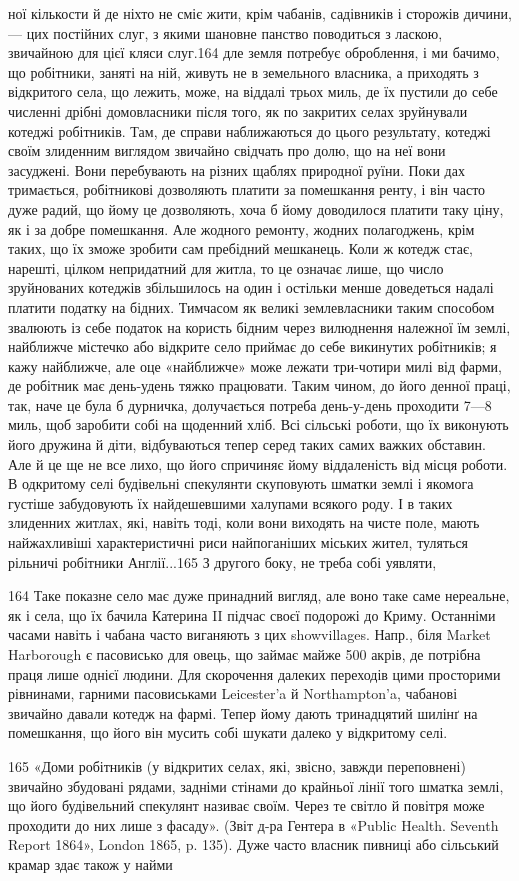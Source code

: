 ної кількости й де ніхто не сміє жити, крім чабанів, садівників
і сторожів дичини, — цих постійних слуг, з якими шановне панство
поводиться з ласкою, звичайною для цієї кляси слуг.164
дле земля потребує оброблення, і ми бачимо, що робітники,
заняті на ній, живуть не в земельного власника, а приходять з
відкритого села, що лежить, може, на віддалі трьох миль, де
їх пустили до себе численні дрібні домовласники після того, як
по закритих селах зруйнували котеджі робітників. Там, де справи
наближаються до цього результату, котеджі своїм злиденним
виглядом звичайно свідчать про долю, що на неї вони засуджені.
Вони перебувають на різних щаблях природної руїни. Поки
дах тримається, робітникові дозволяють платити за помешкання
ренту, і він часто дуже радий, що йому це дозволяють, хоча б
йому доводилося платити таку ціну, як і за добре помешкання.
Але жодного ремонту, жодних полагоджень, крім таких, що їх
зможе зробити сам пребідний мешканець. Коли ж котедж стає,
нарешті, цілком непридатний для житла, то це означає лише,
що число зруйнованих котеджів збільшилось на один і остільки
менше доведеться надалі платити податку на бідних. Тимчасом
як великі землевласники таким способом звалюють із себе податок
на користь бідним через вилюднення належної їм землі, найближче
містечко або відкрите село приймає до себе викинутих
робітників; я кажу найближче, але оце «найближче» може лежати
три-чотири милі від фарми, де робітник має день-удень
тяжко працювати. Таким чином, до його денної праці, так, наче
це була б дурничка, долучається потреба день-у-день проходити
7—8 миль, щоб заробити собі на щоденний хліб. Всі сільські
роботи, що їх виконують його дружина й діти, відбуваються
тепер серед таких самих важких обставин. Але й це ще не все
лихо, що його спричиняє йому віддаленість від місця роботи.
В одкритому селі будівельні спекулянти скуповують шматки землі
і якомога густіше забудовують їх найдешевшими халупами
всякого роду. І в таких злиденних житлах, які, навіть тоді,
коли вони виходять на чисте поле, мають найжахливіші характеристичні
риси найпоганіших міських жител, туляться рільничі
робітники Англії...165 З другого боку, не треба собі уявляти,

164 Таке показне село має дуже принадний вигляд, але воно таке
саме нереальне, як і села, що їх бачила Катерина II підчас своєї подорожі
до Криму. Останніми часами навіть і чабана часто виганяють з цих showvillages.
Напр., біля Market Harborough є пасовисько для овець, що
займає майже 500 акрів, де потрібна праця лише однієї людини. Для скорочення
далеких переходів цими просторими рівнинами, гарними пасовиськами
Leicester’a й Northampton’a, чабанові звичайно давали котедж
на фармі. Тепер йому дають тринадцятий шилінґ на помешкання, що його
він мусить собі шукати далеко у відкритому селі.

165 «Доми робітників (у відкритих селах, які, звісно, завжди переповнені)
звичайно збудовані рядами, задніми стінами до крайньої лінії
того шматка землі, що його будівельний спекулянт називає своїм. Через
те світло й повітря може проходити до них лише з фасаду». (Звіт д-ра
Гентера в «Public Health. Seventh Report 1864», London 1865, p. 135).
Дуже часто власник пивниці або сільський крамар здає також у найми

